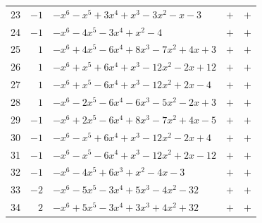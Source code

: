\documentclass[11pt]{article}
\begin{document}
\begin{longtable}{@{}rrlcc@{}}
23 & $-1$ & $-x^{6}-x^{5}+3x^{4}+x^{3}-3x^{2}-x-3$ & $+$ & $+$\\
24 & $-1$ & $-x^{6}-4x^{5}-3x^{4}+x^{2}-4$ & $+$ & $+$\\
25 & $1$ & $-x^{6}+4x^{5}-6x^{4}+8x^{3}-7x^{2}+4x+3$ & $+$ & $+$\\
26 & $1$ & $-x^{6}+x^{5}+6x^{4}+x^{3}-12x^{2}-2x+12$ & $+$ & $+$\\
27 & $1$ & $-x^{6}+x^{5}-6x^{4}+x^{3}-12x^{2}+2x-4$ & $+$ & $+$\\
28 & $1$ & $-x^{6}-2x^{5}-6x^{4}-6x^{3}-5x^{2}-2x+3$ & $+$ & $+$\\
29 & $-1$ & $-x^{6}+2x^{5}-6x^{4}+8x^{3}-7x^{2}+4x-5$ & $+$ & $+$\\
30 & $-1$ & $-x^{6}-x^{5}+6x^{4}+x^{3}-12x^{2}-2x+4$ & $+$ & $+$\\
31 & $-1$ & $-x^{6}-x^{5}-6x^{4}+x^{3}-12x^{2}+2x-12$ & $+$ & $+$\\
32 & $-1$ & $-x^{6}-4x^{5}+6x^{3}+x^{2}-4x-3$ & $+$ & $+$\\
33 & $-2$ & $-x^{6}-5x^{5}-3x^{4}+5x^{3}-4x^{2}-32$ & $+$ & $+$\\
34 & $2$ & $-x^{6}+5x^{5}-3x^{4}+3x^{3}+4x^{2}+32$ & $+$ & $+$\\
\end{longtable}
\endgroup
\end{document}
